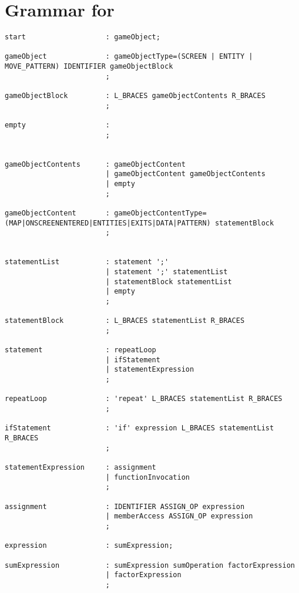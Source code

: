 \section{Grammar for \dazel}\label{app:DazelGrammar}

\begin{lstlisting}[language=CSharp, caption={The grammar for \dazel}, label={lst:DazelGrammar},escapechar=~]
    start                   : gameObject;

gameObject              : gameObjectType=(SCREEN | ENTITY | MOVE_PATTERN) IDENTIFIER gameObjectBlock
                        ;
                        
gameObjectBlock         : L_BRACES gameObjectContents R_BRACES
                        ;

empty                   : 
                        ;


gameObjectContents      : gameObjectContent
                        | gameObjectContent gameObjectContents
                        | empty
                        ;

gameObjectContent       : gameObjectContentType=(MAP|ONSCREENENTERED|ENTITIES|EXITS|DATA|PATTERN) statementBlock 
                        ;
                       

statementList           : statement ';'
                        | statement ';' statementList
                        | statementBlock statementList
                        | empty
                        ;
                        
statementBlock          : L_BRACES statementList R_BRACES
                        ;

statement               : repeatLoop
                        | ifStatement
                        | statementExpression
                        ;

repeatLoop              : 'repeat' L_BRACES statementList R_BRACES
                        ;

ifStatement             : 'if' expression L_BRACES statementList R_BRACES
                        ;

statementExpression     : assignment
                        | functionInvocation
                        ;

assignment              : IDENTIFIER ASSIGN_OP expression
                        | memberAccess ASSIGN_OP expression
                        ;

expression              : sumExpression;

sumExpression           : sumExpression sumOperation factorExpression
                        | factorExpression
                        ;


\end{lstlisting}
